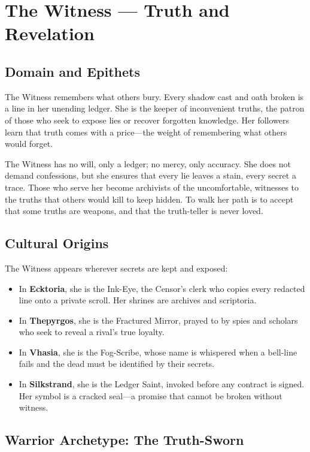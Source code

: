 \section{The Witness — Truth and Revelation}

\subsection{Domain and Epithets}

The Witness remembers what others bury. Every shadow cast and oath broken is a line in her unending ledger. She is the keeper of inconvenient truths, the patron of those who seek to expose lies or recover forgotten knowledge. Her followers learn that truth comes with a price—the weight of remembering what others would forget.

The Witness has no will, only a ledger; no mercy, only accuracy. She does not demand confessions, but she ensures that every lie leaves a stain, every secret a trace. Those who serve her become archivists of the uncomfortable, witnesses to the truths that others would kill to keep hidden. To walk her path is to accept that some truths are weapons, and that the truth-teller is never loved.

\subsection{Cultural Origins}

The Witness appears wherever secrets are kept and exposed:

\begin{itemize}
\item In \textbf{Ecktoria}, she is the Ink-Eye, the Censor's clerk who copies every redacted line onto a private scroll. Her shrines are archives and scriptoria.
\item In \textbf{Thepyrgos}, she is the Fractured Mirror, prayed to by spies and scholars who seek to reveal a rival's true loyalty.
\item In \textbf{Vhasia}, she is the Fog-Scribe, whose name is whispered when a bell-line fails and the dead must be identified by their secrets.
\item In \textbf{Silkstrand}, she is the Ledger Saint, invoked before any contract is signed. Her symbol is a cracked seal—a promise that cannot be broken without witness.
\end{itemize}

\subsection{Warrior Archetype: The Truth-Sworn}

